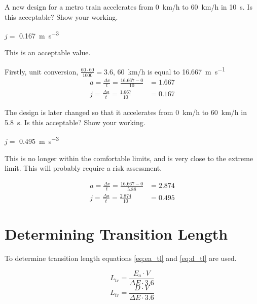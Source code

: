 \documentclass{bcrre_exam}
\begin{document}
\begin{questions}
\question
A new design for a metro train accelerates from \qty{0}{km/h} to \qty{60}{km/h} in \qty{10}{\second}. Is this acceptable? Show your working.

\begin{solution}
    $j=$ \qty{0.167}{\meter \per \second \cubed}
    
    This is an acceptable value.

    Firstly, unit conversion, $\frac{60 \cdot 60}{1000}=3.6$, \qty{60}{km/h} is equal to \qty{16.667}{\meter \per \second}
    \begin{equation}
        \begin{split}
            a=\frac{\Delta v}{t}=\frac{16.667-0}{10}&=1.667\\
            j=\frac{\Delta a}{t}=\frac{1.667}{10}&=0.167
        \end{split}
    \end{equation}
\end{solution}

\question
The design is later changed so that it accelerates from \qty{0}{km/h} to \qty{60}{km/h} in \qty{5.8}{\second}. Is this acceptable? Show your working.

\begin{solution}
    $j=$ \qty{0.495}{\meter \per \second \cubed}
    
    This is no longer within the comfortable limits, and is very close to the extreme limit. This will probably require a risk assessment.

    \begin{equation}
        \begin{split}
            a=\frac{\Delta v}{t}=\frac{16.667-0}{5.88}&=2.874\\
            j=\frac{\Delta a}{t}=\frac{2.874}{10}&=0.495
        \end{split}
    \end{equation}
\end{solution}

\end{questions}

\newpage
\section{Determining Transition Length}

To determine transition length equations \ref{eq:ea_tl} and \ref{eq:d_tl} are used.

\begin{equation}
    \label{eq:ea_tl}
    L_{tr}=\frac{E_a \cdot V}{\Delta E \cdot 3.6}
\end{equation}
\begin{equation}
    \label{eq:d_tl}
    L_{tr}=\frac{D\cdot V}{\Delta E \cdot 3.6}
\end{equation}
\end{document}

